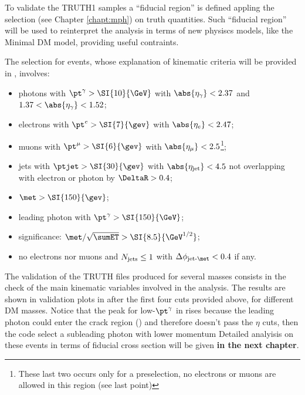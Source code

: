 To validate the TRUTH1 samples a ``fiducial region'' is defined appling the \mph selection (see Chapter \ref{chapt:mph}) on truth quantities. Such ``fiducial region'' will be used to reinterpret the \mph analysis in terms of new physiscs models, like the Minimal DM model, providing useful contraints.
 
The selection for \mph events, whose explanation of kinematic criteria will be provided in \Sect{\ref{sec:SRselection}}, involves:
\begin{itemize}
\item photons with $\pt^\gamma>\SI{10}{\GeV}$ with $\abs{\eta_\gamma}<2.37$ and $1.37<\abs{\eta_\gamma}<1.52$;
\item electrons with $\pt^e>\SI{7}{\gev}$ with $\abs{\eta_e}<2.47$;
\item muons with $\pt^\mu>\SI{6}{\gev}$ with $\abs{\eta_\mu}<2.5$\footnote{These last two occurs only for a preselection, no electrons or muons are allowed in this region (see last point)};
\item jets with $\ptjet>\SI{30}{\gev}$ with $\abs{\eta_{\textup{jet}}}<4.5$ not overlapping with electron or photon by $\DeltaR > 0.4$;
\item $\met>\SI{150}{\gev}$;
\item leading photon with $\pt^\gamma > \SI{150}{\GeV}$;
\item \met significance: $\met/\sqrt{\sumET} > \SI{8.5}{\GeV^{1/2}}$;
\item no electrons nor muons and $N_\textup{jets}\le 1$ with $\Delta\phi_\textup{jet-\met}<0.4$ if any.
\end{itemize}

The validation of the TRUTH files produced for several \chizero masses consists in the check of the main kinematic variables involved in the analysis. The results are shown in validation plots in \Fig{\ref{fig:validation}} after the first four cuts provided above, for different DM masses. Notice that the peak for low-$\pt^\gamma$ in \Fig{\ref{subfig:phpt}} rises because the leading photon could enter the crack region () and therefore doesn't pass the $\eta$ cuts, then the code select a subleading photon with lower momentum
Detailed analyisis on these events in terms of fiducial cross section will be given {\bfseries in the next chapter}.

